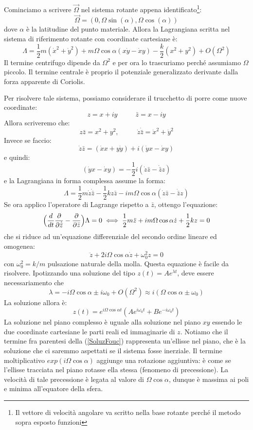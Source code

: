 \documentclass[a4paper,openany]{article}
\begin{document}
	Cominciamo a scrivere $\vec{\Omega}$ nel sistema rotante appena identificato\footnote{Il vettore di velocità angolare va scritto nella base rotante perché il metodo sopra esposto funzioni}:
	$$
	\vec{\Omega} = (0,\Omega \sin(\alpha), \Omega \cos(\alpha))
	$$
	dove $\alpha$ è la latitudine del punto materiale. Allora la Lagrangiana scritta nel sistema di riferimento rotante con coordinate cartesiane è:
	\begin{equation}
		\Lambda = \dfrac{1}{2}m(\dot{x}^{2}+\dot{y}^{2}) + m\Omega \cos\alpha (x\dot{y}-\dot{x}y) - \dfrac{k}{2}(x^2+y^2) + O(\Omega^2)
	\end{equation}
	Il termine centrifugo dipende da $\Omega^2$ e per ora lo trascuriamo perché assumiamo $\Omega$ piccolo. Il termine centrale è proprio il potenziale generalizzato derivante dalla forza apparente di Coriolis. 
	
	Per risolvere tale sistema, possiamo considerare il trucchetto di porre come nuove coordinate:
	$$
	z = x+iy \>\>\>\>\>\>\>\>\>\>\>\> \bar{z} = x-iy
	$$
	Allora scriveremo che:
	$$
	z\bar{z} = x^2 + y^2,  \>\>\>\>\>\>\>\>\>\>\>\>  \dot{z}\dot{\bar{z}} = \dot{x}^2 + \dot{y}^2
	$$
	Invece se faccio:
	$$
	\dot{z}\bar{z} = (\dot{x}x+y\dot{y})+i(\dot{y}x-\dot{x}y)
	$$
	e quindi:
	$$
	(\dot{y}x-\dot{x}y) = -\dfrac{1}{2}i (\dot{z}\bar{z}-\dot{\bar{z}}z)
	$$
	e la Lagrangiana in forma complessa assume la forma:
	$$
	\Lambda = \dfrac{1}{2}m\dot{z}\dot{\bar{z}} - \dfrac{1}{2}kz\bar{z} -im\Omega\cos\alpha(\dot{z}\bar{z}-\dot{\bar{z}}z)
	$$
	Se ora applico l'operatore di Lagrange rispetto a $\bar{z}$, ottengo l'equazione:
	$$
	\Bigl(\dfrac{d}{dt}\dfrac{\partial }{\partial \dot{\bar{z}}}-\dfrac{\partial}{\partial \bar{z}}\Bigl)\Lambda = 0 \iff \dfrac{1}{2}m\ddot{z} + im\Omega\cos\alpha\dot{z}+\dfrac{1}{2}kz = 0
	$$
	che si riduce ad un'equazione differenziale del secondo ordine lineare ed omogenea:
	$$
	\ddot{z} + 2i\Omega\cos\alpha \dot{z} +\omega^{2}_{0} z = 0
	$$
	con $\omega_0^2 = k/m$ pulsazione naturale della molla. Questa equazione è facile da risolvere. Ipotizzando una soluzione del tipo $z(t) = Ae^{\lambda t}$, deve essere necessariamento che 
	$$
	\lambda = -i\Omega\cos\alpha \pm i\omega_0 + O(\Omega^{2}) \approx  i(\Omega\cos\alpha \pm \omega_0)
	$$
	La soluzione allora è:
	\begin{equation}
		z(t) = e^{i\Omega\cos\alpha t}(Ae^{i\omega_0 t}+ Be^{-i\omega_0 t})
		\label{SoluzFouc}
	\end{equation}
	La soluzione nel piano complesso è uguale alla soluzione nel piano $xy$ essendo le due coordinate cartesiane le parti reali ed immaginarie di $z$. Notiamo che il termine fra parentesi della (\ref{SoluzFouc}) rappresenta un'ellisse nel piano, che è la soluzione che ci saremmo aspettati se il sistema fosse inerziale. Il termine moltiplicativo $exp(i\Omega\cos\alpha)$ aggiunge una rotazione aggiuntiva: è come se l'ellisse tracciata nel piano rotasse ella stessa (fenomeno di precessione). La velocità di tale precessione è legata al valore di $\Omega\cos\alpha$, dunque è massima ai poli e minima all'equatore della sfera.
\end{document}
